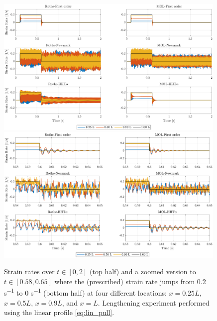 \documentclass{sfuthesis}
\numberwithin{equation}{section}
\numberwithin{figure}{chapter}
\numberwithin{table}{chapter}
\theoremstyle{definition}
\begin{document}
\begin{figure}
    \centering
    \includegraphics[width=0.99\textwidth]{nh_linear_vel_1.eps}
    \includegraphics[width=0.99\textwidth]{nh_linear_vel_2.eps}
    \caption{Strain rates over $t \in [0,2]$ (top half) and a zoomed version to $t \in [0.58,0.65]$ where the (prescribed) strain rate jumps from 0.2 \si{s^{-1}} to 0 \si{s^{-1}} (bottom half)  at four different locations: $x = 0.25L$, $x=0.5L$, $x=0.9L$, and $x=L$. Lengthening experiment performed using the linear profile \eqref{eq:lin_pull}.
    \label{fig:lin_pull_vel}}
\end{figure}
\end{document}
